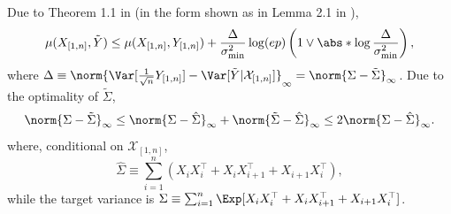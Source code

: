 \documentclass[aos]{imsart}
\begin{document}
\begin{appendix}
Due to Theorem 1.1 in \cite{fang2020high} (in the form shown as in Lemma 2.1 in ), 
\begin{equation*}
    \mu(X_{[1,n]}, \tilde{Y}) \leq \mu(X_{[1,n]}, Y_{[1,n]}) + \frac{\Delta}{\sigma_{\min}^2} \log(ep) \left( 1 \vee \abs*{\log\frac{\Delta}{\sigma_{\min}^2}} \right),
\end{equation*}
where $\Delta \equiv \norm{\Var[\frac{1}{\sqrt{n}} Y_{[1,n]}] - \Var[\tilde{Y} | \mathcal{X}_{[1,n]}]}_\infty = \norm{\Sigma - \tilde\Sigma}_\infty$. 
%
Due to the optimality of $\tilde\Sigma$, 
\begin{equation*}
    \norm{\Sigma - \tilde\Sigma}_\infty 
    \leq \norm{\Sigma - \hat\Sigma}_\infty
    + \norm{\tilde\Sigma - \hat\Sigma}_\infty
    \leq 2 \norm{\Sigma - \hat\Sigma}_\infty.
\end{equation*}
where, conditional on $\mathcal{X}_{[1,n]}$, %
\begin{equation*}
    \hat\Sigma
    \equiv \sum_{i=1}^n \left( X_i X_i^\top 
    + X_i X_{i+1}^\top + X_{i+1} X_i^\top \right),
\end{equation*}
while the target variance is $\Sigma \equiv \sum_{i=1}^n \Exp[  X_i X_i^\top + X_i X_{i+1}^\top + X_{i+1} X_i^\top ]$.

\end{appendix}
\end{document}
